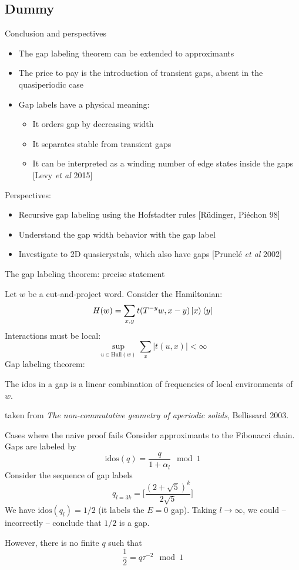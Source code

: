 \documentclass[xcolor=x11names,compress,professionalfonts]{beamer}
\renewcommand{\(}{\begin{columns}}
\renewcommand{\)}{\end{columns}}
\newcommand{\<}[1]{\begin{column}{#1}}
\renewcommand{\>}{\end{column}}
\newcommand{\id}{\ensuremath{\text{idos}}}
\begin{document}
\subsection{Dummy}
\begin{frame}{Conclusion and perspectives}
\begin{itemize}
	\item The gap labeling theorem can be extended to approximants
	\item The price to pay is the introduction of transient gaps, absent in the quasiperiodic case
	\item Gap labels have a physical meaning:
	\begin{itemize}
		\item It orders gap by decreasing width
		\item It separates stable from transient gaps
		\item It can be interpreted as a winding number of edge states inside the gaps \small{[Levy \emph{et al} 2015]}
	\end{itemize}
\end{itemize}
Perspectives:
\begin{itemize}
	\item Recursive gap labeling using the Hofstadter rules  \small{[Rüdinger, Piéchon 98]}
	\item Understand the gap width behavior with the gap label
	\item Investigate to 2D quasicrystals, which also have gaps \small{[Prunelé \emph{et al} 2002]}
\end{itemize}
\end{frame}

\begin{frame}{The gap labeling theorem: precise statement}

Let $w$ be a cut-and-project word.
Consider the Hamiltonian:
\[
	H(w) = \sum_{x,y} t( T^{-y}w, x-y) \ket{x} \bra{y}
\]
Interactions must be local:
\[
	\sup_{u \in \text{Hull}(w)} \sum_x |t(u, x)| < \infty
\]
Gap labeling theorem:

The $\id$ in a gap is a linear combination of frequencies of local environments of $w$.
{\flushright
\small{taken from \textit{The non-commutative geometry of aperiodic solids}, Bellissard 2003.}

}
\end{frame}

\begin{frame}{Cases where the naive proof fails}
Consider approximants to the Fibonacci chain.
Gaps are labeled by
\[
	\id(q) = \frac{q}{1+\alpha_l} \mod 1
\]
Consider the sequence of gap labels
\[
	q_{l = 3k} = \Bigg[ \frac{(2+\sqrt{5})^k}{2 \sqrt{5}}\Bigg]
\]
We have $\id(q_l) = 1/2$ (it labels the $E=0$ gap).
Taking $l \to \infty$, we could -- incorrectly -- conclude that $1/2$ is a gap.

However, there is no finite $q$ such that
\[
	\frac{1}{2} = q \tau^{-2} \mod 1
\]

\end{frame}
\end{document}
